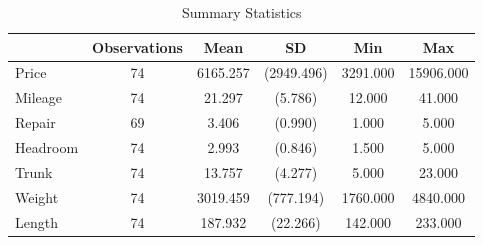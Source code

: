 \begin{table}[ht]
    \centering
{
\def\sym#1{\ifmmode^{#1}\else\(^{#1}\)\fi}
\begin{tabular}{l*{1}{ccccc}}
\hline\hline
                    &Observations&        Mean&          SD&         Min&         Max\\
\hline
Price               &          74&    6165.257&  (2949.496)&    3291.000&   15906.000\\
Mileage             &          74&      21.297&     (5.786)&      12.000&      41.000\\
Repair              &          69&       3.406&     (0.990)&       1.000&       5.000\\
Headroom            &          74&       2.993&     (0.846)&       1.500&       5.000\\
Trunk               &          74&      13.757&     (4.277)&       5.000&      23.000\\
Weight              &          74&    3019.459&   (777.194)&    1760.000&    4840.000\\
Length              &          74&     187.932&    (22.266)&     142.000&     233.000\\
\hline\hline
\end{tabular}
}
\caption{Summary Statistics}
\label{paper1_summary_stat}
\end{table}  